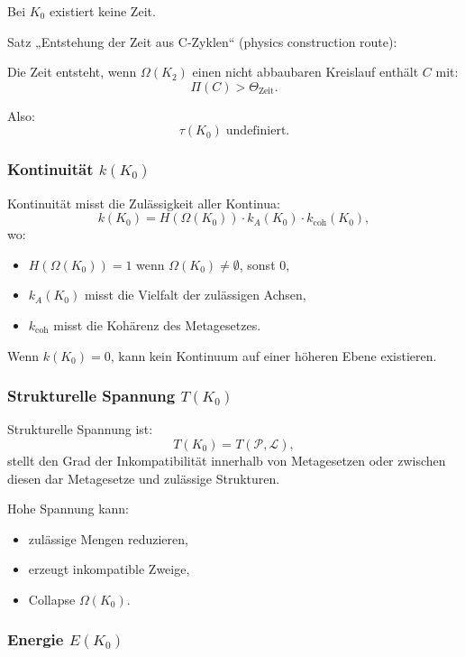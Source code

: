 Bei $K_0$ existiert keine Zeit.

Satz „Entstehung der Zeit aus C-Zyklen“ (physics construction route):

Die Zeit entsteht, wenn $\Omega(K_2)$ einen nicht abbaubaren Kreislauf enthält
$C$ mit:
\[
\Pi(C) > \Theta_{\mathrm{Zeit}}.
\]

Also:
\[
\tau(K_0) \;\text{undefiniert}.
\]

\subsubsection{Kontinuität \texorpdfstring{$k(K_0)$}{k(K_0)}}

Kontinuität misst die Zulässigkeit aller Kontinua:
\[
k(K_0) =
H(\Omega(K_0)) \cdot
k_A(K_0) \cdot
k_{\mathrm{coh}}(K_0),
\]
wo:
\begin{itemize}
    \item $H(\Omega(K_0)) = 1$ wenn $\Omega(K_0)\neq\emptyset$, sonst $0$,
    \item $k_A(K_0)$ misst die Vielfalt der zulässigen Achsen,
    \item $k_{\mathrm{coh}}$ misst die Kohärenz des Metagesetzes.
\end{itemize}

Wenn $k(K_0)=0$, kann kein Kontinuum auf einer höheren Ebene existieren.

\subsubsection{Strukturelle Spannung \texorpdfstring{$T(K_0)$}{T(K_0)}}

Strukturelle Spannung ist:
\[
T(K_0) = T(\mathcal{P}, \mathcal{L}),
\]
stellt den Grad der Inkompatibilität innerhalb von Metagesetzen oder zwischen diesen dar
Metagesetze und zulässige Strukturen.

Hohe Spannung kann:
\begin{itemize}
    \item zulässige Mengen reduzieren,
    \item erzeugt inkompatible Zweige,
    \item Collapse $\Omega(K_0)$.
\end{itemize}

\subsubsection{Energie \texorpdfstring{$E(K_0)$}{E(K_0)}}

